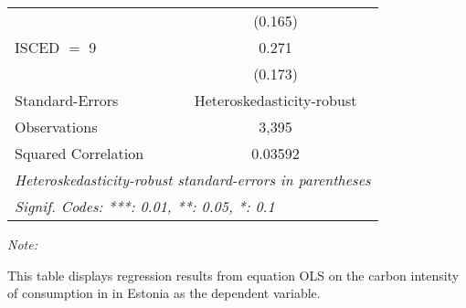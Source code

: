 \begin{table}[htbp!]
\begin{adjustbox}{width = 1\textwidth, max height = 0.95\textheight, center}
\begin{threeparttable}[b]
\begin{tabular}{lc}
                                & (0.165)\\   
            ISCED $=$ 9         & 0.271\\   
                                & (0.173)\\   
            \midrule 
            Standard-Errors     & Heteroskedasticity-robust \\   
            Observations        & 3,395\\  
            Squared Correlation & 0.03592\\  
            \midrule \midrule
            \multicolumn{2}{l}{\emph{Heteroskedasticity-robust standard-errors in parentheses}}\\
            \multicolumn{2}{l}{\emph{Signif. Codes: ***: 0.01, **: 0.05, *: 0.1}}\\
         \end{tabular}
         
         \begin{tablenotes}\item \medskip \textit{Note:}
            \item This table displays regression results from equation OLS on the carbon intensity of consumption in  in Estonia as the dependent variable. 
         \end{tablenotes}
      \end{threeparttable}
   \end{adjustbox}
\end{table}


